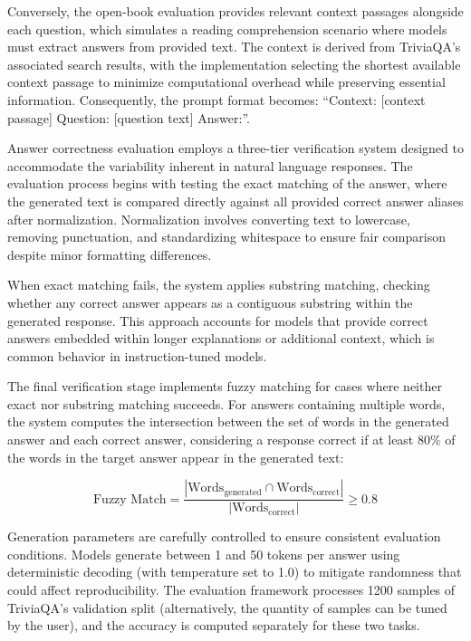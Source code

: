 Conversely, the open-book evaluation provides relevant context passages alongside each question, which simulates a reading comprehension scenario where models must extract answers from provided text. The context is derived from TriviaQA's associated search results, with the implementation selecting the shortest available context passage to minimize computational overhead while preserving essential information. Consequently, the prompt format becomes: ``Context: [context passage] Question: [question text] Answer:''.

Answer correctness evaluation employs a three-tier verification system designed to accommodate the variability inherent in natural language responses. The evaluation process begins with testing the exact matching of the answer, where the generated text is compared directly against all provided correct answer aliases after normalization. Normalization involves converting text to lowercase, removing punctuation, and standardizing whitespace to ensure fair comparison despite minor formatting differences.

When exact matching fails, the system applies substring matching, checking whether any correct answer appears as a contiguous substring within the generated response. This approach accounts for models that provide correct answers embedded within longer explanations or additional context, which is common behavior in instruction-tuned models.

The final verification stage implements fuzzy matching for cases where neither exact nor substring matching succeeds. For answers containing multiple words, the system computes the intersection between the set of words in the generated answer and each correct answer, considering a response correct if at least 80\% of the words in the target answer appear in the generated text:

\begin{equation}
\text{Fuzzy Match} = \frac{|\text{Words}_{\text{generated}} \cap \text{Words}_{\text{correct}}|}{|\text{Words}_{\text{correct}}|} \geq 0.8
\end{equation}

Generation parameters are carefully controlled to ensure consistent evaluation conditions. Models generate between 1 and 50 tokens per answer using deterministic decoding (with temperature set to 1.0) to mitigate randomness that could affect reproducibility. The evaluation framework processes 1200 samples of TriviaQA's validation split (alternatively, the quantity of samples can be tuned by the user), and the accuracy is computed separately for these two tasks.